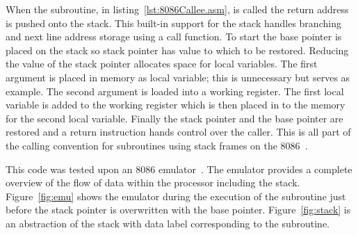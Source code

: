 \documentclass[12pt,a4paper]{article}
\begin{document}
When the subroutine, in listing~\ref{lst:8086Callee.asm}, is called the return address is pushed onto the stack.
This built-in support for the stack handles branching and next line address storage using a call function.
To start the base pointer is placed on the stack so stack pointer has value to which to be restored.
Reducing the value of the stack pointer allocates space for local variables.
The first argument is placed in memory as local variable; this is unnecessary but serves as example.
The second argument is loaded into a working register.
The first local variable is added to the working register which is then placed in to the memory for the second local variable.
Finally the stack pointer and the base pointer are restored and a return instruction hands control over the caller. 
This is all part of the calling convention for subroutines using stack frames on the 8086~\cite{8086call}.
 




This code was tested upon an 8086 emulator~\cite{emu8086}.
The emulator provides a complete overview of the flow of data within the processor including the stack. 
Figure~\ref{fig:emu} shows the emulator during the execution of the subroutine just before the stack pointer is overwritten with the base pointer.
Figure~\ref{fig:stack} is an abstraction of the stack with data label corresponding to the subroutine. 
\end{document}

